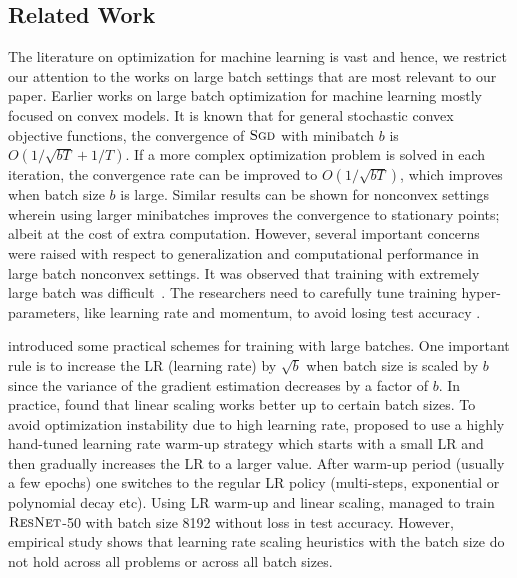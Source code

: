 \iffalse
\subsection{Related Work}

The literature on optimization for machine learning is vast and hence, we restrict our attention to the works on large batch settings that are most relevant to our paper. Earlier works on large batch optimization for machine learning mostly focused on convex models. It is known that for general stochastic convex objective functions, the convergence of $\textsc{Sgd}$ with minibatch $b$ is $O(1/\sqrt{bT} + 1/T)$.  If a more complex optimization problem is solved in each iteration, the convergence rate can be improved to $O(1/\sqrt{bT})$, which improves when batch size $b$ is large. Similar results can be shown for nonconvex settings wherein using larger minibatches improves the convergence to stationary points; albeit at the cost of extra computation. However, several important concerns were raised with respect to generalization and computational performance in large batch nonconvex settings. It was observed that training with extremely large batch was difficult~\citep{keskar2016large, hoffer2017train}. The researchers need to carefully tune training hyper-parameters, like learning rate and momentum, to avoid losing test accuracy \citep{goyal2017accurate, li2017scaling, you2018imagenet, shallue2018measuring}. 

\citet{krizhevsky2014one} introduced some practical schemes for training with large batches. One important rule is to increase the LR (learning rate) by $\sqrt{b}$ when batch size is scaled by $b$ since  the variance of the gradient estimation decreases by a factor of $b$. In practice, \citep{krizhevsky2014one} found that  linear scaling works better up to certain batch sizes. To avoid optimization instability due to high learning rate, \citet{goyal2017accurate} proposed to use a highly hand-tuned  learning rate warm-up strategy which starts with a small LR and then gradually increases the LR to a larger value. After warm-up period (usually a few epochs) one switches to the regular LR policy (multi-steps, exponential or polynomial decay etc). Using LR warm-up and linear scaling, \citet{goyal2017accurate} managed to train $\textsc{ResNet}$-50 with batch size 8192 without loss in test accuracy. However, empirical study \citep{shallue2018measuring} shows that learning rate scaling heuristics with the batch size do not hold across all problems or across all batch sizes.

